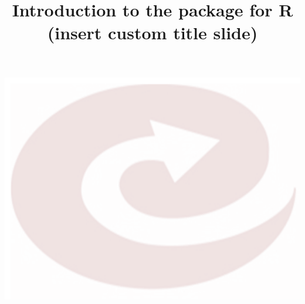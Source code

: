 \documentclass[mathserif,11pt]{beamer}
\title{Introduction to the {\plant} package for R\\(insert custom title slide)}
\date{}
\author{}
\begin{document}

{\includegraphics[width=\paperwidth,height=\paperheight,keepaspectratio]{pics/background.png}}

 \begin{frame}[plain]
 \vspace{10em}
 \begin{TitleBox}
  {\LARGE \inserttitle} \vskip3pt
  {\footnotesize \insertdate\vskip6pt
  \insertauthor }
 \end{TitleBox}
 \end{frame}
\end{document}
